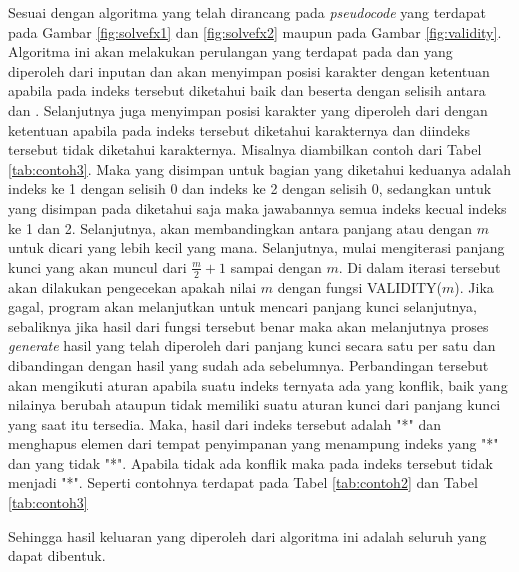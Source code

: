 \indent Sesuai dengan algoritma yang telah dirancang pada \textit{pseudocode} yang terdapat pada Gambar \ref{fig:solvefx1} dan \ref{fig:solvefx2} maupun pada Gambar \ref{fig:validity}. Algoritma ini akan melakukan perulangan yang terdapat pada \plaintext dan \ciphertext yang diperoleh dari inputan dan akan menyimpan posisi karakter dengan ketentuan apabila pada indeks tersebut diketahui baik \plaintext dan \ciphertext beserta dengan selisih antara \ciphertext dan \plaintext. Selanjutnya juga menyimpan posisi karakter yang diperoleh dari \ciphertext dengan ketentuan apabila \ciphertext pada indeks tersebut diketahui karakternya dan \plaintext diindeks tersebut tidak diketahui karakternya. Misalnya diambilkan contoh dari Tabel \ref{tab:contoh3}. Maka yang disimpan untuk bagian yang diketahui keduanya adalah indeks ke 1 dengan selisih 0 dan indeks ke 2 dengan selisih 0, sedangkan untuk yang disimpan pada diketahui \ciphertext saja maka jawabannya semua indeks kecual indeks ke 1 dan 2. Selanjutnya, akan membandingkan antara panjang \plaintext atau \ciphertext dengan $m$ untuk dicari yang lebih kecil yang mana. Selanjutnya, mulai mengiterasi panjang kunci yang akan muncul dari $\frac{m}{2}+1$ sampai dengan $m$. Di dalam iterasi tersebut akan dilakukan pengecekan apakah nilai $m$ dengan fungsi VALIDITY($m$). Jika gagal, program akan melanjutkan untuk mencari panjang kunci selanjutnya, sebaliknya jika hasil dari fungsi tersebut benar maka akan melanjutnya proses \textit{generate} hasil yang telah diperoleh dari panjang kunci secara satu per satu dan dibandingan dengan hasil yang sudah ada sebelumnya. Perbandingan tersebut akan mengikuti aturan apabila suatu indeks ternyata ada yang konflik, baik yang nilainya berubah ataupun tidak memiliki suatu aturan kunci dari panjang kunci yang saat itu tersedia. Maka, hasil dari indeks tersebut adalah "*" dan menghapus elemen dari tempat penyimpanan yang menampung indeks \plaintext yang "*" dan \ciphertext yang tidak "*". Apabila tidak ada konflik maka \plaintext pada indeks tersebut tidak menjadi "*". Seperti contohnya terdapat pada Tabel \ref{tab:contoh2} dan Tabel \ref{tab:contoh3}  


\indent Sehingga hasil keluaran yang diperoleh dari algoritma ini adalah seluruh \plaintext yang dapat dibentuk.

